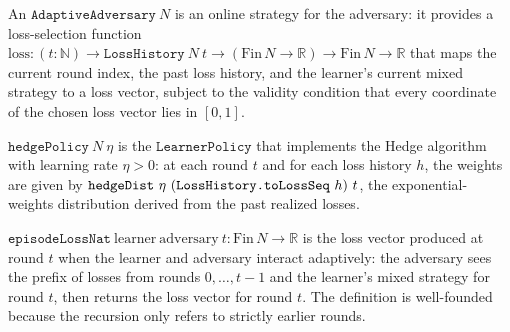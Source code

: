 \begin{definition}
\label{AdaptiveAdversary}
\leanok
{}
An $\texttt{AdaptiveAdversary}\ N$ is an online strategy for the adversary:
it provides a loss-selection function
$\mathrm{loss} : (t : \mathbb{N}) \to \texttt{LossHistory}\ N\ t \to (\mathrm{Fin}\,N \to \mathbb{R}) \to \mathrm{Fin}\,N \to \mathbb{R}$
that maps the current round index, the past loss history, and the learner's
current mixed strategy to a loss vector, subject to the validity condition
that every coordinate of the chosen loss vector lies in $[0, 1]$.
\end{definition}

\begin{definition}
\label{hedgePolicy}
\leanok
{}
$\texttt{hedgePolicy}\ N\ \eta$ is the $\texttt{LearnerPolicy}$ that implements the
Hedge algorithm with learning rate $\eta > 0$: at each round $t$ and for each
loss history $h$, the weights are given by $\texttt{hedgeDist}\ \eta\ (\text{\texttt{LossHistory.toLossSeq}}\ h)\ t$,
the exponential-weights distribution derived from the past realized losses.
\end{definition}

\begin{definition}
\label{episodeLossNat}
\leanok
{}
$\texttt{episodeLossNat}\ \mathrm{learner}\ \mathrm{adversary}\ t : \mathrm{Fin}\,N \to \mathbb{R}$
is the loss vector produced at round $t$ when the learner and adversary interact
adaptively: the adversary sees the prefix of losses from rounds $0, \ldots, t-1$
and the learner's mixed strategy for round $t$, then returns the loss vector for
round $t$.  The definition is well-founded because the recursion only refers to
strictly earlier rounds.
\end{definition}

